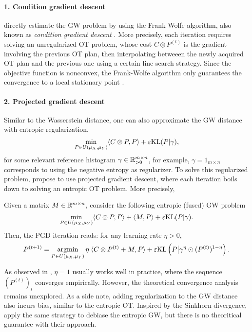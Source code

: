 \paragraph{1. Condition gradient descent} \citet{Vayer19b} directly estimate the GW problem by using
the Frank-Wolfe algorithm, also known as \textit{condition gradient descent}
\citep{Frank56,Jaggi13}. More precisely, each iteration requires
solving an unregularized OT problem, whose cost $C \otimes P^{(t)}$ is the gradient
involving the previous OT plan, then interpolating betweeen the newly acquired OT plan and
the previous one using a certain line search strategy. Since the objective function is nonconvex,
the Frank-Wolfe algorithm only guarantees the convergence to a local stationary point \citep{Julien16}.

\paragraph{2. Projected gradient descent} Similar to the Wasserstein distance,
one can also approximate the GW distance with entropic regularization.
\begin{align}
  \min_{\substack{P \in U(\mu_X, \mu_Y)}} \langle C \otimes P, P \rangle + \varepsilon \text{KL}(P | \gamma),
\end{align}
for some relevant reference histogram $\gamma \in \mathbb R^{m \times n}_{> 0}$,
for example, $\gamma = 1_{m \times n}$ corresponds to using the negative entropy as regularizer.
To solve this regularized problem, \citet{Peyre16,Solomon16} propose to use projected gradient descent,
where each iteration boils down to solving an entropic OT problem. More precisely,
\begin{lemma}
  \label{lemma:fgw_pgd}
  Given a matrix $M \in \mathbb R^{m \times n}$, consider the following entropic (fused) GW problem
  \begin{align}
    \label{eq:fused_egw}
    \min_{\substack{P \in U(\mu_X, \mu_Y)}} \langle C \otimes P, P \rangle
    + \langle M, P \rangle + \varepsilon \text{KL}(P | \gamma).
  \end{align}
  Then, the PGD iteration reads: for any learning rate $\eta > 0$,
  \begin{align}
    P^{(t+1)} = \operatorname*{argmin}_{P \in U(\mu_X, \mu_Y)}
    \eta \; \langle C \otimes P^{(t)} + M, P \rangle
    + \varepsilon \text{KL} \left( P \big| \gamma^{\eta} \odot (P^{(t)})^{1 - \eta} \right).
  \end{align}
\end{lemma}
As observed in \citep{Peyre19}, $\eta = 1$ usually works well in practice,
where the sequence $(P^{(t)})_t$ converges empirically. However, the theoretical
convergence analysis remains unexplored. As a side note,
adding regularization to the GW distance also incurs bias,
similar to the entropic OT. Inspired by the Sinkhorn divergence,
\citet{Bunne19} apply the same strategy to debiase the entropic GW,
but there is no theoritical guarantee with their approach.

